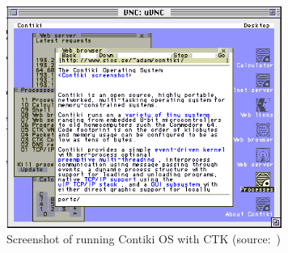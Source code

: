 \begin{figure}
  \centering
  \includegraphics[width=9cm,keepaspectratio]{fig/contiki-vnc.png}
  \caption{Screenshot of running Contiki OS with CTK (source:~\cite{contiki-docs})}
\end{figure}
